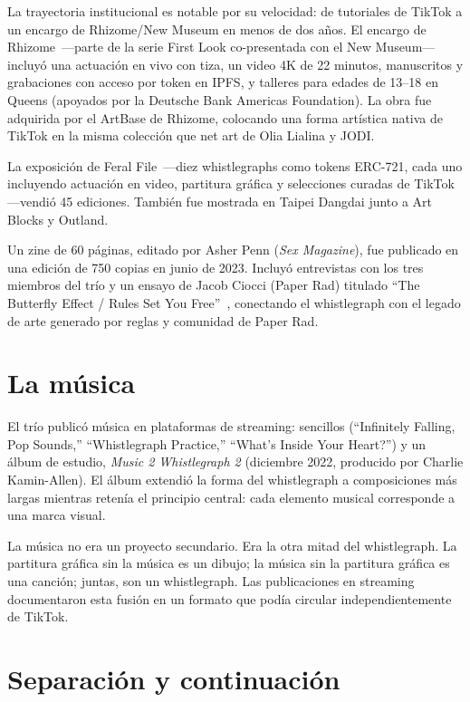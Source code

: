 \documentclass[10pt,letterpaper,twocolumn]{article}
\begin{document}
La trayectoria institucional es notable por su velocidad: de tutoriales de TikTok a un encargo de Rhizome/New Museum en menos de dos años. El encargo de Rhizome~\citep{rhizome2022longest}---parte de la serie First Look co-presentada con el New Museum---incluyó una actuación en vivo con tiza, un video 4K de 22 minutos, manuscritos y grabaciones con acceso por token en IPFS, y talleres para edades de 13--18 en Queens (apoyados por la Deutsche Bank Americas Foundation). La obra fue adquirida por el ArtBase de Rhizome, colocando una forma artística nativa de TikTok en la misma colección que net art de Olia Lialina y JODI.

La exposición de Feral File~\citep{feralfile2022ten}---diez whistlegraphs como tokens ERC-721, cada uno incluyendo actuación en video, partitura gráfica y selecciones curadas de TikTok---vendió 45 ediciones. También fue mostrada en Taipei Dangdai junto a Art Blocks y Outland.

Un zine de 60 páginas, editado por Asher Penn (\emph{Sex Magazine}), fue publicado en una edición de 750 copias en junio de 2023. Incluyó entrevistas con los tres miembros del trío y un ensayo de Jacob Ciocci (Paper Rad) titulado ``The Butterfly Effect / Rules Set You Free''~\citep{ciocci2023butterfly}, conectando el whistlegraph con el legado de arte generado por reglas y comunidad de Paper Rad.

\section{La música}

El trío publicó música en plataformas de streaming: sencillos (``Infinitely Falling, Pop Sounds,'' ``Whistlegraph Practice,'' ``What's Inside Your Heart?'') y un álbum de estudio, \emph{Music 2 Whistlegraph 2} (diciembre 2022, producido por Charlie Kamin-Allen). El álbum extendió la forma del whistlegraph a composiciones más largas mientras retenía el principio central: cada elemento musical corresponde a una marca visual.

La música no era un proyecto secundario. Era la otra mitad del whistlegraph. La partitura gráfica sin la música es un dibujo; la música sin la partitura gráfica es una canción; juntas, son un whistlegraph. Las publicaciones en streaming documentaron esta fusión en un formato que podía circular independientemente de TikTok.

\section{Separación y continuación}
\end{document}
